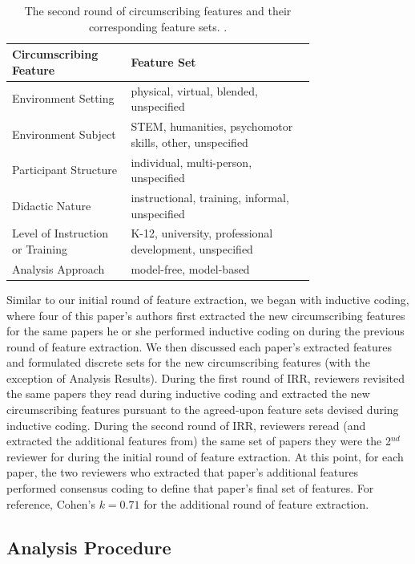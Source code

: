 \documentclass[manuscript,screen,review]{acmart}
\begin{document}
\begin{table}[htbp]
    \renewcommand{\arraystretch}{1.3}%
    \centering
    \caption{The second round of circumscribing features and their corresponding feature sets. .}
    \begin{tabular}{p{0.27\linewidth}@{\hskip .1in} | @{\hskip .1in}p{0.48\linewidth}@{\hskip .1in}}
        \toprule
        Circumscribing Feature & Feature Set\\
        \toprule
        Environment Setting & physical, virtual, blended, unspecified\\
        Environment Subject & STEM, humanities, psychomotor skills, other, unspecified\\
        Participant Structure & individual, multi-person, unspecified\\
        Didactic Nature & instructional, training, informal, unspecified\\
        Level of Instruction or Training & K-12, university, professional development, unspecified\\
        Analysis Approach & model-free, model-based\\
        \bottomrule
    \end{tabular}
    \label{tab:circumscribing_features_2}
\end{table}

Similar to our initial round of feature extraction, we began with inductive coding, where four of this paper's authors first extracted the new circumscribing features for the same papers he or she performed inductive coding on during the previous round of feature extraction. We then discussed each paper's extracted features and formulated discrete sets for the new circumscribing features (with the exception of Analysis Results). During the first round of IRR, reviewers revisited the same papers they read during inductive coding and extracted the new circumscribing features pursuant to the agreed-upon feature sets devised during inductive coding. During the second round of IRR, reviewers reread (and extracted the additional features from) the same set of papers they were the 2$^{nd}$ reviewer for during the initial round of feature extraction. At this point, for each paper, the two reviewers who extracted that paper's additional features performed consensus coding to define that paper's final set of features. For reference, Cohen's $k=0.71$ for the additional round of feature extraction.

\subsection{Analysis Procedure} \label{subsec:analysis_procedure}
\end{document}
